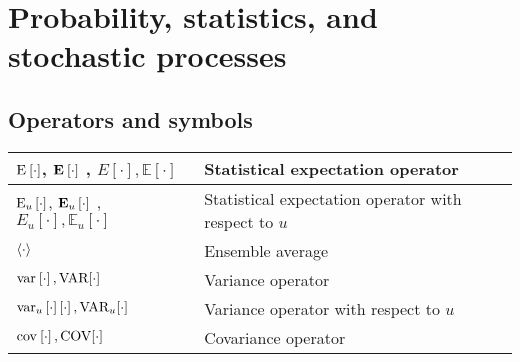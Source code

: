 \section{Probability, statistics, and stochastic processes}
\subsection{Operators and symbols}
\begin{xltabular}{\textwidth}{XX}
	\(\E{\cdot}\), \(\nossekE{\cdot}\) \cite{nossekAdaptiveArraySignal2015}, \(E\left[ \cdot \right], \mathbb{E}\left[ \cdot \right]\)           & Statistical expectation operator \cite{dinizAdaptiveFilteringAlgorithms2002}                                                                                            \\ \hline
	\(\E[u]{\cdot}\), \(\nossekE[u]{\cdot}\) \cite{nossekAdaptiveArraySignal2015}, \(E_u\left[ \cdot \right], \mathbb{E}_u\left[ \cdot \right]\) & Statistical expectation operator with respect to \(u\)                                                                                                                  \\ \hline
	\(\expval{\cdot}\)                                                                                                                           & Ensemble average                                                                                                                                                        \\ \hline
	\(\var{\cdot}, \textnormal{VAR}[\cdot]\)                                                                                                     & Variance operator \cite{haykinAdaptiveFilterTheory2002,leon-garciaProbabilityStatisticsRandom2007,proakisDigitalCommunications2007,bishopPatternRecognitionMachine2006} \\ \hline
	\(\var[u]{\cdot} \left[ \cdot \right], \textnormal{VAR}_u[\cdot]\)                                                                           & Variance operator with respect to \(u\)                                                                                                                                 \\ \hline
	\(\cov{\cdot}, \textnormal{COV}[\cdot]\)                                                                                                     & Covariance operator \cite{bishopPatternRecognitionMachine2006}                                                                                                          \\ \hline

\end{xltabular}
